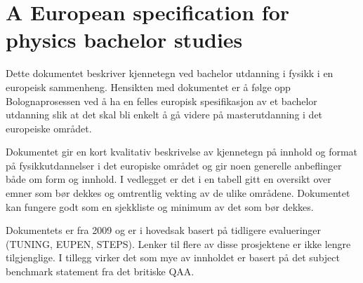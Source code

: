\section{A European specification for physics bachelor studies}

Dette dokumentet beskriver kjennetegn ved bachelor utdanning i fysikk i en europeisk sammenheng. Hensikten med dokumentet er å følge opp Bolognaprosessen ved å ha en felles europisk spesifikasjon av et bachelor utdanning slik at det skal bli enkelt å gå videre på masterutdanning i det europeiske området.

Dokumentet gir en kort kvalitativ beskrivelse av kjennetegn på innhold og format på fysikkutdannelser i det europiske området og gir noen generelle anbeflinger både om form og innhold. I vedlegget er det i en tabell gitt en oversikt over emner som bør dekkes og omtrentlig vekting av de ulike områdene. Dokumentet kan fungere godt som en sjekkliste og minimum av det som bør dekkes. 

Dokumentets er fra 2009 og er i hovedsak basert på tidligere evalueringer (TUNING, EUPEN, STEPS). Lenker til flere av disse prosjektene er ikke lengre tilgjenglige. I tillegg virker det som mye av innholdet er basert på det subject benchmark statement fra det britiske QAA. 
